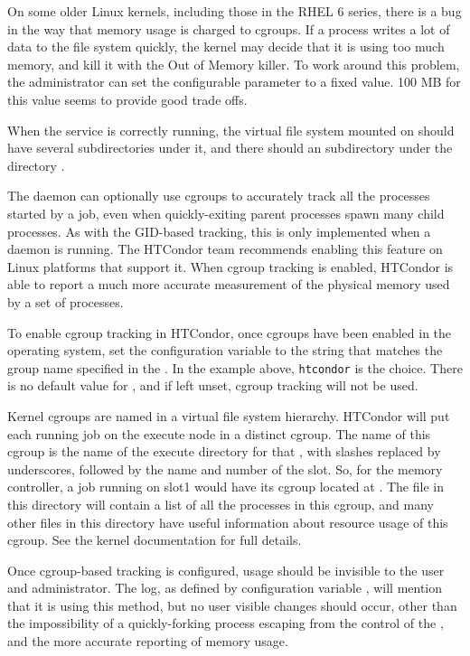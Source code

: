 On some older Linux kernels, including those in the RHEL 6 series,
there is a bug in the way that memory usage is charged to cgroups.
If a process writes a lot of data to the file system quickly, 
the kernel may decide that it is using too much memory, 
and kill it with the Out of Memory killer.
To work around this problem, the administrator
can set the configurable parameter 
to a fixed value.
100 MB for this value seems to provide good trade offs.

When the  service is correctly running, 
the virtual file system
mounted on  should have several subdirectories under it, 
and there should an  subdirectory under the directory 
.

The  daemon can optionally use cgroups
to accurately track all the processes started by a job, 
even when quickly-exiting parent processes spawn many child processes.
As with the GID-based tracking, this is only implemented when a 
 daemon is running.  The HTCondor team recommends enabling 
this feature on Linux platforms that support it.  
When cgroup tracking is enabled, 
HTCondor is able to report a much more accurate
measurement of the physical memory used by a set of processes.

To enable cgroup tracking in HTCondor, once cgroups have been enabled
in the operating system, set the  configuration
variable to the string that matches the group name specified in 
the .
In the example above, \texttt{htcondor} is the choice.  
There is no default value for , 
and if left unset, cgroup tracking will not be used.

Kernel cgroups are named in a virtual file system hierarchy. 
HTCondor will put each running job on the execute node in a distinct cgroup.
The name of this cgroup is the name of the execute directory for 
that , with slashes replaced by underscores, 
followed by the name and number of the slot.  
So, for the memory controller, 
a job running on slot1 would have its cgroup located at
.  
The  file in this directory will contain a list 
of all the processes in this cgroup, and
many other files in this directory have useful information about resource usage
of this cgroup.  See the kernel documentation for full details.

Once cgroup-based tracking is configured, 
usage should be invisible to the user and administrator.  
The  log, as defined by configuration variable
, 
will mention that it is using this method, 
but no user visible changes should occur,
other than the impossibility of a quickly-forking process escaping from the
control of the ,
and the more accurate reporting of memory usage.
